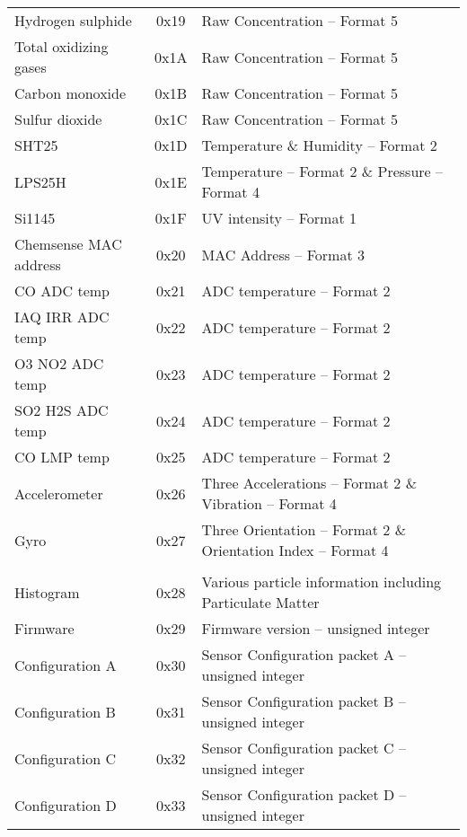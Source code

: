 \begin{center}
\begin{longtable}{|l|c|l|}
        Hydrogen sulphide & 0x19 & Raw Concentration -- Format 5\\
        Total oxidizing gases & 0x1A & Raw Concentration -- Format 5\\
        Carbon monoxide & 0x1B & Raw Concentration -- Format 5\\
        Sulfur dioxide & 0x1C & Raw Concentration -- Format 5\\
        SHT25 & 0x1D & Temperature \& Humidity -- Format 2\\
        LPS25H & 0x1E & Temperature -- Format 2 \& Pressure -- Format 4\\
        Si1145 & 0x1F & UV intensity -- Format 1\\
        Chemsense MAC address & 0x20 & MAC Address -- Format 3\\
        CO ADC temp & 0x21 & ADC temperature -- Format 2\\
        IAQ IRR ADC temp & 0x22 & ADC temperature -- Format 2\\
        O3 NO2 ADC temp & 0x23 & ADC temperature -- Format 2\\
        SO2 H2S ADC temp & 0x24 & ADC temperature -- Format 2\\
        CO LMP temp & 0x25 & ADC temperature -- Format 2\\
        Accelerometer & 0x26 & Three Accelerations -- Format 2 \& Vibration -- Format 4\\
        Gyro & 0x27 & Three Orientation -- Format 2 \& Orientation Index -- Format 4\\
     \hline \rowcolor{white} \multicolumn{3}{|c|}{{Alpha sensor}} \\ \hline
        Histogram & 0x28 & Various particle information including Particulate Matter\\
        Firmware & 0x29 & Firmware version  -- unsigned integer\\
        Configuration A & 0x30 & Sensor Configuration packet A -- unsigned integer\\
        Configuration B & 0x31 & Sensor Configuration packet B -- unsigned integer\\
        Configuration C & 0x32 & Sensor Configuration packet C -- unsigned integer\\
        Configuration D & 0x33 & Sensor Configuration packet D -- unsigned integer\\
\end{longtable}
\end{center}


